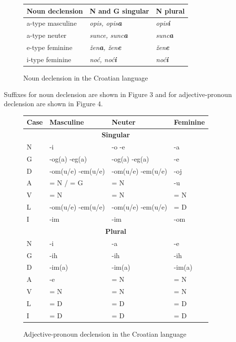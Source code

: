 \begin{multicols}{2}
\begin{figure}[htb]
\centering
	\begin{tabular}{|l|l|l|}
  \hline
  \textbf{Noun declension} & \textbf{N and G singular} & \textbf{N plural} \\ 
  \hline \hline
  a-type masculine    & \emph{opis, opis\textbf{a}}     &  \emph{opis\textbf{i}} \\ 
  \hline
  a-type neuter   & \emph{sunce, sunc\textbf{a}}     &  \emph{sunc\textbf{a}} \\ 
  \hline
  e-type feminine   & \emph{žen\textbf{a}, žen\textbf{e}}     &  \emph{žen\textbf{e}} \\
  \hline
  i-type feminine   & \emph{noć, noć\textbf{i}}     &  \emph{noć\textbf{i}} \\
  \hline
  \end{tabular}
  \caption{Noun declension in the Croatian language}
  \label{fig:imenicka_en}
\end{figure}

Suffixes for noun declension are shown in Figure 3 and for adjective-pronoun declension are shown in Figure 4.

\begin{figure}[htb]
\centering
    \begin{tabular}{|l|l|l|l|}
        \hline
        \textbf{Case} & \textbf{Masculine}        & \textbf{Neuter}       & \textbf{Feminine} \\ \hline
		\multicolumn{4}{|c|}{\textbf{Singular}} \\ \hline
        N     & -i                & -o -e             & -a\\ 
        G     & -og(a) -eg(a)     & -og(a) -eg(a)     & -e\\ 
        D     & -om(u/e) -em(u/e) & -om(u/e) -em(u/e) & -oj\\ 
        A     & = N / = G         & = N               & -u\\ 
        V     & = N               & = N               & = N\\ 
        L     & -om(u/e) -em(u/e) & -om(u/e) -em(u/e) & = D\\ 
        I     & -im               & -im               & -om\\ \hline
		\multicolumn{4}{|c|}{\textbf{Plural}} \\ \hline
		N     & -i        & -a         & -e\\ 
        G     & -ih       & -ih        & -ih\\ 
        D     & -im(a)    & -im(a)     & -im(a)\\ 
        A     & -e        & = N        & = N\\ 
        V     & = N       & = N        & = N\\ 
        L     & = D       & = D        & = D\\ 
        I     & = D       & = D        & = D\\
        \hline
   \end{tabular}
  \caption{Adjective-pronoun declension in the Croatian language}
  \label{fig:zamjenicka_en}
\end{figure}


\end{multicols}
